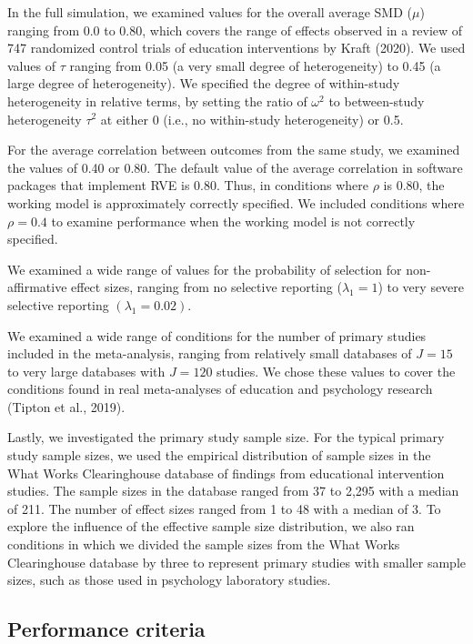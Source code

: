 \documentclass[
  man, donotrepeattitle,floatsintext]{apa7}
\begin{document}
In the full simulation, we examined values for the overall average SMD (\(\mu\)) ranging from 0.0 to 0.80, which covers the range of effects observed in a review of 747 randomized control trials of education interventions by Kraft (2020).
We used values of \(\tau\) ranging from 0.05 (a very small degree of heterogeneity) to 0.45 (a large degree of heterogeneity).
We specified the degree of within-study heterogeneity in relative terms, by setting the ratio of \(\omega^2\) to between-study heterogeneity \(\tau^2\) at either 0 (i.e., no within-study heterogeneity) or 0.5.

For the average correlation between outcomes from the same study, we
examined the values of 0.40 or 0.80. The default value of the average
correlation in software packages that implement RVE is 0.80. Thus, in
conditions where \(\rho\) is 0.80, the working model is approximately
correctly specified. We included conditions where \(\rho = 0.4\) to examine performance when the
working model is not correctly specified.

We examined a wide range of values for the probability of selection for non-affirmative effect sizes, ranging from no selective reporting (\(\lambda_1 = 1\)) to very severe selective reporting \((\lambda_1 = 0.02)\).

We examined a wide range of conditions for the number of primary studies included in the meta-analysis, ranging from relatively small databases of \(J = 15\) to very large databases with \(J = 120\) studies.
We chose these values to cover the conditions found in real meta-analyses of education and psychology research (Tipton et al., 2019).

Lastly, we investigated the primary study sample size.
For the typical primary study sample sizes, we used the empirical distribution of sample sizes in the What Works Clearinghouse database of findings from educational intervention studies.
The sample sizes in the database ranged from 37 to 2,295 with a median of 211.
The number of effect sizes ranged from 1 to 48 with a median of 3.
To explore the influence of the effective sample size distribution, we also ran conditions in which we divided the sample
sizes from the What Works Clearinghouse database by three to represent primary studies with smaller sample sizes,
such as those used in psychology laboratory studies.

\subsection{Performance criteria}\label{performance-criteria}
\end{document}
